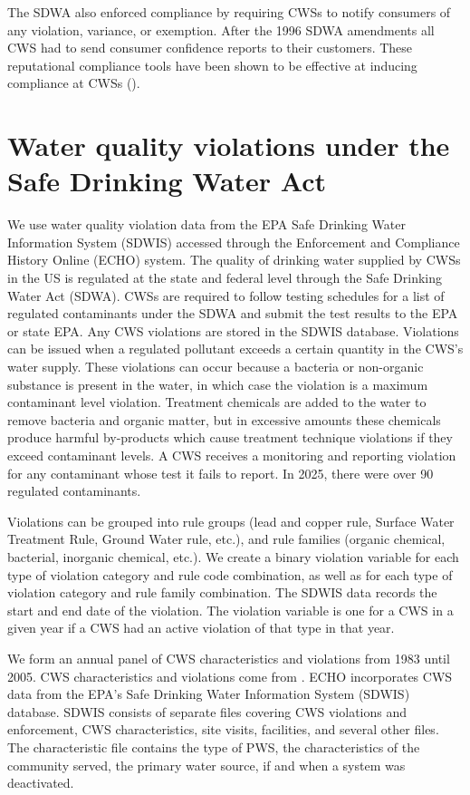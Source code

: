 \documentclass{article}
\begin{document}
The SDWA also enforced compliance by requiring CWSs to notify consumers of any violation, variance, or exemption. After the 1996 SDWA amendments all CWS had to send consumer confidence reports to their customers. These reputational compliance tools have been shown to be effective at inducing compliance at CWSs (\cite{bennear2008impacts}).

\section{Water quality violations under the Safe Drinking Water Act}

We use water quality violation data from the EPA Safe Drinking Water Information System (SDWIS) accessed through the Enforcement and Compliance History Online (ECHO) system. The quality of drinking water supplied by CWSs in the US is regulated at the state and federal level through the Safe Drinking Water Act (SDWA). CWSs are required to follow testing schedules for a list of regulated contaminants under the SDWA and submit the test results to the EPA or state EPA. Any CWS violations are stored in the SDWIS database. Violations can be issued when a regulated pollutant exceeds a certain quantity in the CWS's water supply. These violations can occur because a bacteria or non-organic substance is present in the water, in which case the violation is a maximum contaminant level violation. Treatment chemicals are added to the water to remove bacteria and organic matter, but in excessive amounts these chemicals produce harmful by-products which cause treatment technique violations if they exceed contaminant levels. A CWS receives a monitoring and reporting violation for any contaminant whose test it fails to report. In 2025, there were over 90 regulated contaminants.

Violations can be grouped into rule groups (lead and copper rule, Surface Water Treatment Rule, Ground Water rule, etc.), and rule families (organic chemical, bacterial, inorganic chemical, etc.). We create a binary violation variable for each type of violation category and rule code combination, as well as for each type of violation category and rule family combination. The SDWIS data records the start and end date of the violation. The violation variable is one for a CWS in a given year if a CWS had an active violation of that type in that year. 

We form an annual panel of CWS characteristics and violations from 1983 until 2005. CWS characteristics and violations come from . ECHO incorporates CWS data from the EPA's Safe Drinking Water Information System (SDWIS) database. SDWIS consists of separate files covering CWS violations and enforcement, CWS characteristics, site visits, facilities, and several other files. The characteristic file contains the type of PWS, the characteristics of the community served, the primary water source, if and when a system was deactivated.
\end{document}
